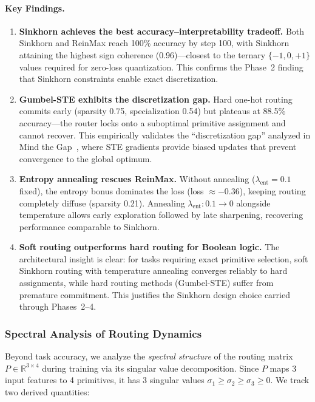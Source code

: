 \documentclass[Royal,times,sageh]{sagej}
\begin{document}
\paragraph{Key Findings.}

\begin{enumerate}
    \item \textbf{Sinkhorn achieves the best accuracy--interpretability tradeoff.} Both Sinkhorn and ReinMax reach 100\% accuracy by step 100, with Sinkhorn attaining the highest sign coherence (0.96)---closest to the ternary $\{-1,0,+1\}$ values required for zero-loss quantization. This confirms the Phase~2 finding that Sinkhorn constraints enable exact discretization.

    \item \textbf{Gumbel-STE exhibits the discretization gap.} Hard one-hot routing commits early (sparsity 0.75, specialization 0.54) but plateaus at 88.5\% accuracy---the router locks onto a suboptimal primitive assignment and cannot recover. This empirically validates the ``discretization gap'' analyzed in Mind the Gap~\cite{yousefi2025gap}, where STE gradients provide biased updates that prevent convergence to the global optimum.

    \item \textbf{Entropy annealing rescues ReinMax.} Without annealing ($\lambda_{\text{ent}}=0.1$ fixed), the entropy bonus dominates the loss (loss $\approx -0.36$), keeping routing completely diffuse (sparsity 0.21). Annealing $\lambda_{\text{ent}}: 0.1 \to 0$ alongside temperature allows early exploration followed by late sharpening, recovering performance comparable to Sinkhorn.

    \item \textbf{Soft routing outperforms hard routing for Boolean logic.} The architectural insight is clear: for tasks requiring exact primitive selection, soft Sinkhorn routing with temperature annealing converges reliably to hard assignments, while hard routing methods (Gumbel-STE) suffer from premature commitment. This justifies the Sinkhorn design choice carried through Phases~2--4.
\end{enumerate}

\subsubsection{Spectral Analysis of Routing Dynamics}
\label{sec:spectral_analysis}

Beyond task accuracy, we analyze the \textit{spectral structure} of the routing matrix $P \in \mathbb{R}^{3 \times 4}$ during training via its singular value decomposition. Since $P$ maps 3 input features to 4 primitives, it has 3 singular values $\sigma_1 \geq \sigma_2 \geq \sigma_3 \geq 0$. We track two derived quantities:
\end{document}
